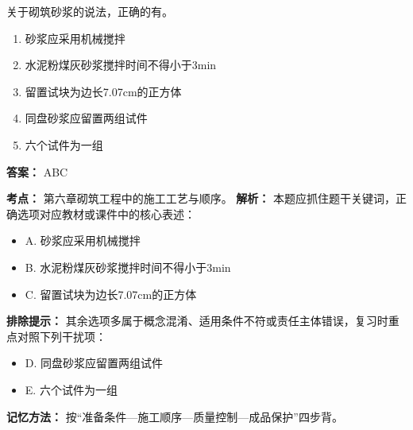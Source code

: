 \documentclass[UTF8,fontset=fandol,11pt]{ctexart}
\begin{document}
\vspace{0.2em}

\begin{quizbox}[title={第 9 题}]
关于砌筑砂浆的说法，正确的有。\\
\begin{enumerate}[label=\Alph*.]
\item 砂浆应采用机械搅拌
\item 水泥粉煤灰砂浆搅拌时间不得小于3min
\item 留置试块为边长7.07cm的正方体
\item 同盘砂浆应留置两组试件
\item 六个试件为一组
\end{enumerate}
\textbf{答案：} ABC
\vspace{0.25em}
\begin{answerbox}[title={考点解析}]
\textbf{考点：} 第六章砌筑工程中的施工工艺与顺序。
\textbf{解析：} 本题应抓住题干关键词，正确选项对应教材或课件中的核心表述：
\begin{itemize}
\item A. 砂浆应采用机械搅拌
\item B. 水泥粉煤灰砂浆搅拌时间不得小于3min
\item C. 留置试块为边长7.07cm的正方体
\end{itemize}
\textbf{排除提示：} 其余选项多属于概念混淆、适用条件不符或责任主体错误，复习时重点对照下列干扰项：
\begin{itemize}
\item D. 同盘砂浆应留置两组试件
\item E. 六个试件为一组
\end{itemize}
\textbf{记忆方法：} 按“准备条件—施工顺序—质量控制—成品保护”四步背。
\end{answerbox}
\end{quizbox}

\vspace{0.2em}
\end{document}
